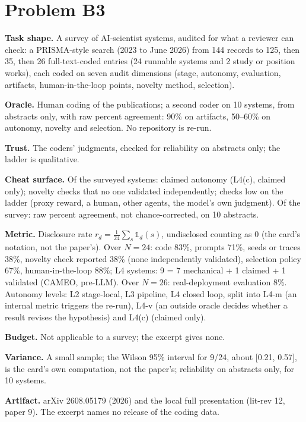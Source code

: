 \documentclass[11pt]{article}
\begin{document}
\section*{Problem B3}\label{ans:B3}
\begin{answer}
\textbf{Task shape.} A survey of AI-scientist systems, audited for what a
reviewer can check: a PRISMA-style search (2023 to June 2026) from 144
records to 125, then 35, then 26 full-text-coded entries (24 runnable systems
and 2 study or position works), each coded on seven audit dimensions (stage,
autonomy, evaluation, artifacts, human-in-the-loop points, novelty method,
selection).

\textbf{Oracle.} Human coding of the publications; a second coder on 10
systems, from abstracts only, with raw percent agreement: 90\% on artifacts,
50--60\% on autonomy, novelty and selection. No repository is re-run.

\textbf{Trust.} The coders' judgments, checked for reliability on abstracts
only; the ladder is qualitative.

\textbf{Cheat surface.} Of the surveyed systems: claimed autonomy (L4(c), claimed
only); novelty checks that no one validated independently; checks low on the
ladder (proxy reward, a human, other agents, the model's own judgment). Of the
survey: raw percent agreement, not chance-corrected, on 10 abstracts.

\textbf{Metric.} Disclosure rate $r_d = \frac{1}{24}\sum_s
\mathbb{1}_d(s)$, undisclosed counting as 0 (the card's notation, not the
paper's). Over $N = 24$: code 83\%, prompts 71\%, seeds or traces 38\%,
novelty check reported 38\% (none independently validated), selection policy
67\%, human-in-the-loop 88\%; L4 systems: 9 = 7 mechanical + 1 claimed + 1
validated (CAMEO, pre-LLM). Over $N = 26$: real-deployment evaluation 8\%.
Autonomy levels: L2 stage-local, L3 pipeline, L4 closed loop, split into L4-m
(an internal metric triggers the re-run), L4-v (an outside oracle decides
whether a result revises the hypothesis) and L4(c) (claimed only).

\textbf{Budget.} Not applicable to a survey; the excerpt gives none.

\textbf{Variance.} A small sample; the Wilson 95\% interval for 9/24, about
[0.21, 0.57], is the card's own computation, not the paper's; reliability on
abstracts only, for 10 systems.

\textbf{Artifact.} arXiv 2608.05179 (2026) and the local full presentation
(lit-rev 12, paper 9). The excerpt names no release of the coding data.


\end{answer}
\end{document}
